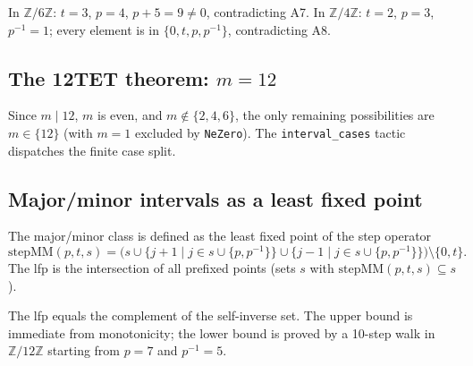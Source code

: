 \documentclass{amsart}
\begin{document}
In $\mathbb{Z}/6\mathbb{Z}$: $t = 3$, $p = 4$, $p + 5 = 9 \neq 0$,
contradicting A7.  In $\mathbb{Z}/4\mathbb{Z}$: $t = 2$, $p = 3$,
$p^{-1} = 1$; every element is in $\{0, t, p, p^{-1}\}$, contradicting A8.



\subsection*{The 12TET theorem: $m = 12$}

Since $m \mid 12$, $m$ is even, and $m \notin \{2, 4, 6\}$, the only
remaining possibilities are $m \in \{12\}$ (with $m = 1$ excluded by
\texttt{NeZero}).  The \texttt{interval\_cases} tactic dispatches the
finite case split.



\subsection*{Major/minor intervals as a least fixed point}

The major/minor class is defined as the least fixed point of the step
operator
\[
  \mathrm{stepMM}(p,t,s)
    = \bigl(s
        \cup \{j+1 \mid j \in s \cup \{p,p^{-1}\}\}
        \cup \{j-1 \mid j \in s \cup \{p,p^{-1}\}\}
      \bigr) \setminus \{0,t\}.
\]
The lfp is the intersection of all prefixed points (sets $s$ with
$\mathrm{stepMM}(p,t,s) \subseteq s$).



The lfp equals the complement of the self-inverse set.  The upper bound
is immediate from monotonicity; the lower bound is proved by a 10-step
walk in $\mathbb{Z}/12\mathbb{Z}$ starting from $p = 7$ and $p^{-1} = 5$.


\end{document}
